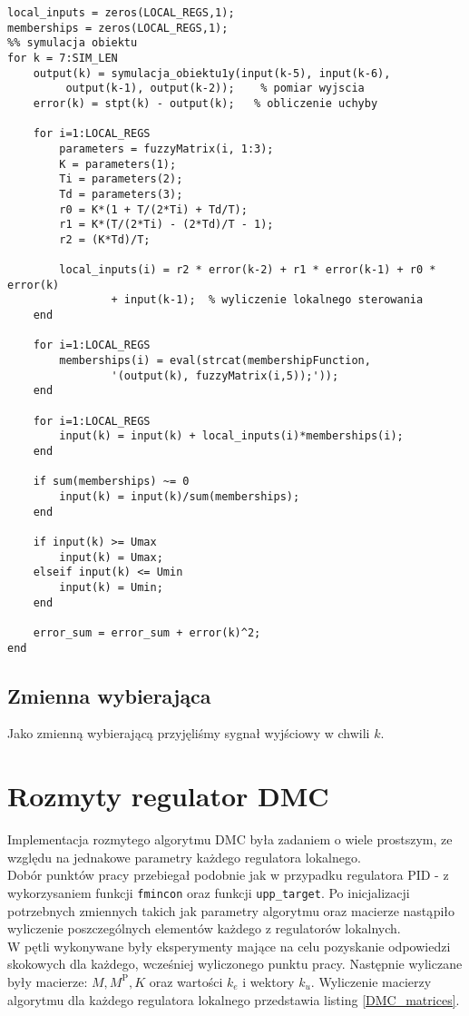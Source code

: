 \begin{lstlisting}[style=custommatlab,frame=single,label={FPID_sim},caption={Symulacja rozmytego algorytmu PID},captionpos=b]
local_inputs = zeros(LOCAL_REGS,1);
memberships = zeros(LOCAL_REGS,1);
%% symulacja obiektu
for k = 7:SIM_LEN
    output(k) = symulacja_obiektu1y(input(k-5), input(k-6),
    	 output(k-1), output(k-2));    % pomiar wyjscia
    error(k) = stpt(k) - output(k);   % obliczenie uchyby
    
    for i=1:LOCAL_REGS
        parameters = fuzzyMatrix(i, 1:3);
        K = parameters(1);
        Ti = parameters(2);
        Td = parameters(3);
        r0 = K*(1 + T/(2*Ti) + Td/T);
        r1 = K*(T/(2*Ti) - (2*Td)/T - 1);
        r2 = (K*Td)/T;
        
        local_inputs(i) = r2 * error(k-2) + r1 * error(k-1) + r0 * error(k) 
        		+ input(k-1);  % wyliczenie lokalnego sterowania
    end
    
    for i=1:LOCAL_REGS
        memberships(i) = eval(strcat(membershipFunction, 
        		'(output(k), fuzzyMatrix(i,5));'));
    end
    
    for i=1:LOCAL_REGS
        input(k) = input(k) + local_inputs(i)*memberships(i);
    end
    
    if sum(memberships) ~= 0
        input(k) = input(k)/sum(memberships);
    end
    
    if input(k) >= Umax
        input(k) = Umax;
    elseif input(k) <= Umin
        input(k) = Umin;
    end
    
    error_sum = error_sum + error(k)^2;
end
\end{lstlisting}
\subsection{Zmienna wybierająca}
Jako zmienną wybierającą przyjęliśmy sygnał wyjściowy w chwili $k$.

\section{Rozmyty regulator DMC}
Implementacja rozmytego algorytmu DMC była zadaniem o wiele prostszym, ze względu na jednakowe parametry każdego regulatora lokalnego.\\
\indent{} Dobór punktów pracy przebiegał podobnie jak w przypadku regulatora PID - z wykorzysaniem funkcji \verb+fmincon+ oraz funkcji \verb+upp_target+. Po inicjalizacji potrzebnych zmiennych takich jak parametry algorytmu oraz macierze nastąpiło wyliczenie poszczególnych elementów każdego z regulatorów lokalnych.\\
\indent{} W pętli wykonywane były eksperymenty mające na celu pozyskanie odpowiedzi skokowych dla każdego, wcześniej wyliczonego punktu pracy. Następnie wyliczane były macierze: $M, M^{\mathrm{P}}, K$ oraz wartości $k_{e}$ i wektory $k_{u}$. Wyliczenie macierzy algorytmu dla każdego regulatora lokalnego przedstawia listing \ref{DMC_matrices}.\\


